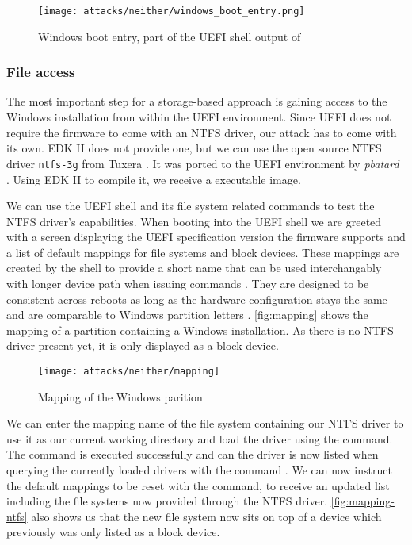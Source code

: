 \begin{figure}[htb]
    \centering
    \texttt{[image: attacks/neither/windows\_boot\_entry.png]}
    \caption{Windows boot entry, part of the \ac{UEFI} shell output of }
    \label{fig:windows-boot-entry}
\end{figure}

\subsubsection{File access}

The most important step for a storage-based approach is gaining access to the Windows installation from within the \ac{UEFI} environment.
Since \ac{UEFI} does not require the firmware to come with an \ac{NTFS} driver, our attack has to come with its own.
\ac{EDK} II does not provide one, but we can use the open source \ac{NTFS} driver \lstinline{ntfs-3g} from Tuxera \cite{ntfs-3g}.
It was ported to the \ac{UEFI} environment by \emph{pbatard} \cite{ntfs-3g-uefi}.
Using \ac{EDK} II to compile it, we receive a  executable image.

We can use the \ac{UEFI} shell and its file system related commands to test the \ac{NTFS} driver's capabilities.
When booting into the \ac{UEFI} shell we are greeted with a screen displaying the \ac{UEFI} specification version the firmware supports and a list of default mappings for file systems and block devices.
These mappings are created by the shell to provide a short name that can be used interchangably with longer device path when issuing commands \cite[Section 3.7.2]{uefi-shell-spec}.
They are designed to be consistent across reboots as long as the hardware configuration stays the same and are comparable to Windows partition letters \cite[Appendix A]{uefi-shell-spec}.
\autoref{fig:mapping} shows the mapping of a partition containing a Windows installation.
As there is no \ac{NTFS} driver present yet, it is only displayed as a block device.

\begin{figure}[htb]
    \centering
    \texttt{[image: attacks/neither/mapping]}
    \caption{Mapping of the Windows parition}
    \label{fig:mapping}
\end{figure}

We can enter the mapping name of the file system containing our \ac{NTFS} driver to use it as our current working directory and load the driver using the  command.
The command is executed successfully and can the driver is now listed when querying the currently loaded drivers with the command .
We can now instruct the default mappings to be reset with the  command, to receive an updated list including the file systems now provided through the \ac{NTFS} driver.
\autoref{fig:mapping-ntfs} also shows us that the new file system now sits on top of a device which previously was only listed as a block device.

